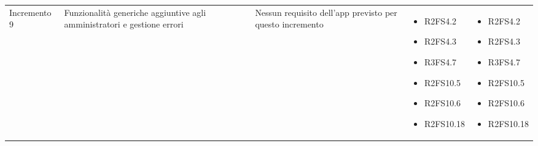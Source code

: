 {\begin{longtable}{C{2.5cm} C{3.2cm} C{2.8cm} C{2.8cm} C{2.8cm}}
Incremento 9 & Funzionalità generiche aggiuntive agli amministratori e gestione errori & 
    Nessun requisito dell'app previsto per questo incremento
     & \begin{itemize} 
    \item[ ] R2FS4.2
    \item[ ] R2FS4.3
    \item[ ] R3FS4.7
    \item[ ] R2FS10.5
    \item[ ] R2FS10.6
    \item[ ] R2FS10.18
\end{itemize} & \begin{itemize} 
    \item[ ] R2FS4.2
    \item[ ] R2FS4.3
    \item[ ] R3FS4.7
    \item[ ] R2FS10.5
    \item[ ] R2FS10.6
    \item[ ] R2FS10.18
\end{itemize} \\

\end{longtable}
}
